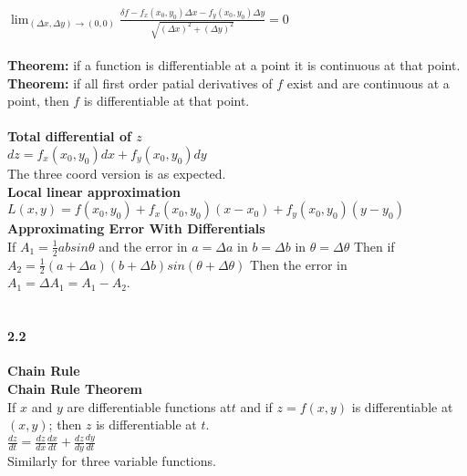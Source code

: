 \documentclass[14pt]{extreport}
\begin{document}
$\lim_{( \Delta x, \Delta y) \to (0, 0)} \frac{\delta f - f_x(x_0, y_0)\Delta x - f_y(x_0, y_0)\Delta y}{\sqrt{(\Delta x)^2 + (\Delta y)^2}} = 0$\\\\

\textbf{Theorem: } if a function is differentiable at a point it is continuous at that point.\\

\textbf{Theorem: } if all first order patial derivatives of $f$ exist and are continuous at a point, then $f$ is differentiable at that point.\\\\



\textbf{Total differential of $z$}\\
$dz = f_x(x_0, y_0)dx + f_y(x_0, y_0)dy$\\

The three coord version is as expected.\\

\textbf{Local linear approximation}\\
$L(x, y) = f(x_0, y_0) + f_x(x_0, y_0)(x - x_0) + f_y(x_0, y_0)(y - y_0)$\\


\textbf{Approximating Error With Differentials}\\
If $A_1=\frac{1}{2}absin \theta$ and the error in $a=\Delta a$ in $b= \Delta b$ in $\theta = \Delta \theta$
Then if $A_2 = \frac{1}{2}(a + \Delta a)(b + \Delta b)sin(\theta + \Delta \theta)$ Then the error in $A_1 = \Delta A_1 = A_1 - A_2$.\\\\
\paragraph{2.2}\textbf{Chain Rule}\\

\textbf{Chain Rule Theorem}\\

If $x$ and $y$ are differentiable functions at$t$ and if $z = f(x,y)$ is differentiable at $(x, y)$; then $z$ is differentiable at $t$.\\

$\frac{dz}{dt}= \frac{dz}{dx}\frac{dx}{dt}+\frac{dz}{dy}\frac{dy}{dt}$\\

Similarly for three variable functions.\\
\end{document}
